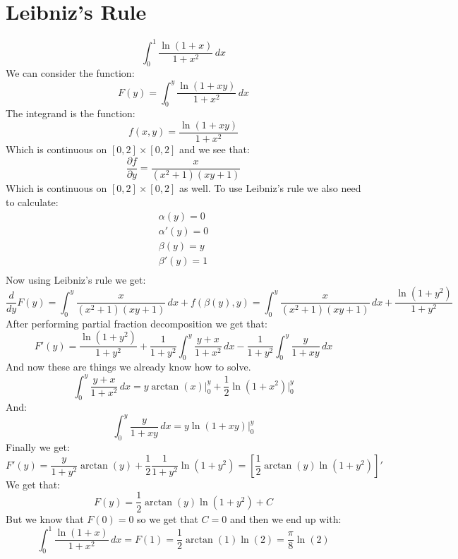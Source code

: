 \documentclass[11pt,a4paper]{article}
\begin{document}
	\section{Leibniz's Rule}
	\[
		\int_{0}^{1}{\frac{\ln(1+x)}{1+x^2}\,dx}
	\]
	We can consider the function:
	\[
		F(y) = \int_{0}^{y}{\frac{\ln(1+xy)}{1+x^2}\,dx}
	\]
	The integrand is the function:
	\[
		f(x,y) = \frac{\ln(1+xy)}{1+x^2}
	\]
	Which is continuous on $[0,2]\times[0,2]$ and we see that:
	\[
		\frac{\partial f}{\partial y} = 
		\dfrac{x}{\left(x^2+1\right)\left(xy+1\right)}
	\]
	Which is continuous on $[0,2]\times[0,2]$ as well. To use Leibniz's
	rule we also need to calculate:
	\begin{align*}
		\alpha(y) = 0 \\
		\alpha'(y) = 0 \\
		\beta(y) = y \\
		\beta'(y) = 1 \\
	\end{align*}
	Now using Leibniz's rule we get:
	\[
		\frac{d}{dy}F(y) = 
		\int_{0}^{y}{\dfrac{x}{\left(x^2+1\right)\left(xy+1\right)}\,dx} + 
		f(\beta(y),y) = 
		\int_{0}^{y}{\dfrac{x}{\left(x^2+1\right)\left(xy+1\right)}\,dx} +
		\frac{\ln(1+y^2)}{1+y^2}
	\]
	After performing partial fraction decomposition we get that:
	\[
		F'(y) = 
		\frac{\ln(1+y^2)}{1+y^2} + 
		\frac{1}{1+y^2}\int_{0}^{y}{\frac{y+x}{1+x^2}\,dx} -
		\frac{1}{1+y^2}\int_{0}^{y}{\frac{y}{1+xy}\,dx}
	\]
	And now these are things we already know how to solve.
	\[
		\int_{0}^{y}{\frac{y+x}{1+x^2}\,dx} = 
		y\arctan(x)\biggr\vert^{y}_{0} + 
		\frac{1}{2}\ln(1+x^2)\biggr\vert^{y}_{0}
	\]
	And:
	\[
		\int_{0}^{y}{\frac{y}{1+xy}\,dx} = 
		y\ln(1+xy)\biggr\vert^{y}_{0}
	\]
	Finally we get:
	\[
		F'(y) = 
		\frac{y}{1+y^2}\arctan(y) + 
		\frac{1}{2}\frac{1}{1+y^2}\ln(1+y^2) = 
		\left[\frac{1}{2} \arctan(y)\ln(1+y^2)\right]'
	\]
	We get that:
	\[
		F(y) = \frac{1}{2} \arctan(y)\ln(1+y^2) + C
	\]
	But we know that $F(0) = 0$ so we get that $C = 0$ and then we end up 
	with:
	\[
		\int_{0}^{1}{\frac{\ln(1+x)}{1+x^2}\,dx} = F(1) = 
		\frac{1}{2} \arctan(1)\ln(2) = \frac{\pi}{8}\ln(2)
	\]
	
	\newpage
	
\end{document}
